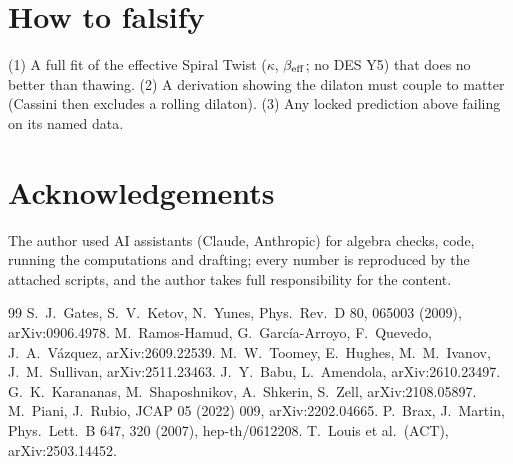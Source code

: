 \documentclass[11pt]{article}
\begin{document}
\section{How to falsify}
(1) A full fit of the effective Spiral Twist ($\kappa$, $\beta_{\rm eff}$; no DES Y5) that does no better than thawing.
(2) A derivation showing the dilaton must couple to matter (Cassini then excludes a rolling dilaton). (3) Any locked
prediction above failing on its named data.

\section*{Acknowledgements}
The author used AI assistants (Claude, Anthropic) for algebra checks, code, running the computations and drafting;
every number is reproduced by the attached scripts, and the author takes full responsibility for the content.

\begin{thebibliography}{99}
 S.~J.~Gates, S.~V.~Ketov, N.~Yunes, Phys.\ Rev.\ D 80, 065003 (2009), arXiv:0906.4978.
 M.~Ramos-Hamud, G.~Garc\'ia-Arroyo, F.~Quevedo, J.~A.~V\'azquez, arXiv:2609.22539.
 M.~W.~Toomey, E.~Hughes, M.~M.~Ivanov, J.~M.~Sullivan, arXiv:2511.23463.
 J.~Y.~Babu, L.~Amendola, arXiv:2610.23497.
 G.~K.~Karananas, M.~Shaposhnikov, A.~Shkerin, S.~Zell, arXiv:2108.05897.
 M.~Piani, J.~Rubio, JCAP 05 (2022) 009, arXiv:2202.04665.
 P.~Brax, J.~Martin, Phys.\ Lett.\ B 647, 320 (2007), hep-th/0612208.
 T.~Louis et al.\ (ACT), arXiv:2503.14452.
\end{thebibliography}
\end{document}
